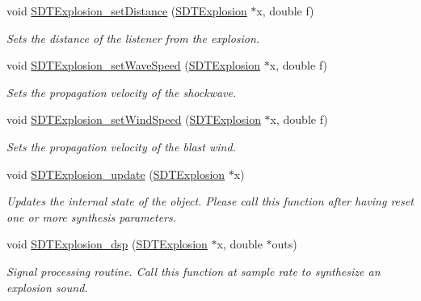 \begin{DoxyCompactItemize}
void \hyperlink{group__explosions_gae0a55198a5ca115743a67f9e1aee6bdd}{S\+D\+T\+Explosion\+\_\+set\+Distance} (\hyperlink{group__explosions_ga9be74dfac803ba58938fa89367285343}{S\+D\+T\+Explosion} $\ast$x, double f)
\begin{DoxyCompactList}\small\item\em Sets the distance of the listener from the explosion. \end{DoxyCompactList}\item 
void \hyperlink{group__explosions_gac34ce16e91a9d0edcc380627aa985f58}{S\+D\+T\+Explosion\+\_\+set\+Wave\+Speed} (\hyperlink{group__explosions_ga9be74dfac803ba58938fa89367285343}{S\+D\+T\+Explosion} $\ast$x, double f)
\begin{DoxyCompactList}\small\item\em Sets the propagation velocity of the shockwave. \end{DoxyCompactList}\item 
void \hyperlink{group__explosions_ga4d605e033e91897729849f9da9606f7a}{S\+D\+T\+Explosion\+\_\+set\+Wind\+Speed} (\hyperlink{group__explosions_ga9be74dfac803ba58938fa89367285343}{S\+D\+T\+Explosion} $\ast$x, double f)
\begin{DoxyCompactList}\small\item\em Sets the propagation velocity of the blast wind. \end{DoxyCompactList}\item 
\hypertarget{group__explosions_gaaf5006654372cb953f701ca2c644f328}{}void \hyperlink{group__explosions_gaaf5006654372cb953f701ca2c644f328}{S\+D\+T\+Explosion\+\_\+update} (\hyperlink{group__explosions_ga9be74dfac803ba58938fa89367285343}{S\+D\+T\+Explosion} $\ast$x)\label{group__explosions_gaaf5006654372cb953f701ca2c644f328}

\begin{DoxyCompactList}\small\item\em Updates the internal state of the object. Please call this function after having reset one or more synthesis parameters. \end{DoxyCompactList}\item 
void \hyperlink{group__explosions_ga52725161c20b23d31187cad3b987d5af}{S\+D\+T\+Explosion\+\_\+dsp} (\hyperlink{group__explosions_ga9be74dfac803ba58938fa89367285343}{S\+D\+T\+Explosion} $\ast$x, double $\ast$outs)
\begin{DoxyCompactList}\small\item\em Signal processing routine. Call this function at sample rate to synthesize an explosion sound. \end{DoxyCompactList}\end{DoxyCompactItemize}


